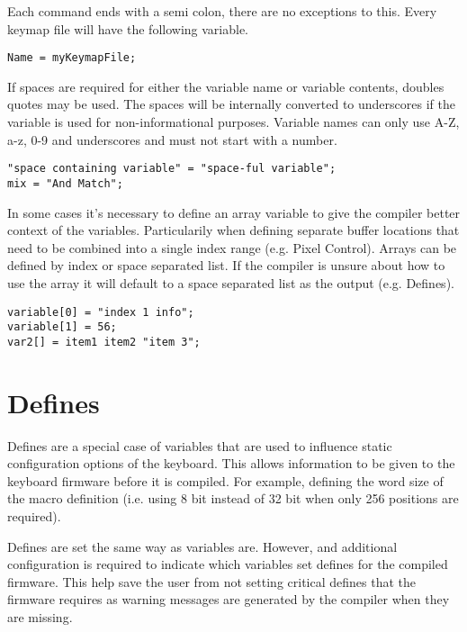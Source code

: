 \documentclass{kiibohd-template}
\begin{document}
Each command ends with a semi colon, there are no exceptions to this.
Every keymap file will have the following variable.

\begin{lstlisting}
Name = myKeymapFile;
\end{lstlisting}

If spaces are required for either the variable name or variable contents, doubles quotes may be used.
The spaces will be internally converted to underscores if the variable is used for non-informational purposes.
Variable names can only use A-Z, a-z, 0-9 and underscores and must not start with a number.

\begin{lstlisting}
"space containing variable" = "space-ful variable";
mix = "And Match";
\end{lstlisting}

In some cases it's necessary to define an array variable to give the compiler better context of the variables.
Particularily when defining separate buffer locations that need to be combined into a single index range (e.g. Pixel Control).
Arrays can be defined by index or space separated list.
If the compiler is unsure about how to use the array it will default to a space separated list as the output (e.g. Defines).

\begin{lstlisting}
variable[0] = "index 1 info";
variable[1] = 56;
var2[] = item1 item2 "item 3";
\end{lstlisting}


\section{Defines}
\label{sec:Defines}

Defines are a special case of variables that are used to influence static configuration options of the keyboard.
This allows information to be given to the keyboard firmware before it is compiled.
For example, defining the word size of the macro definition (i.e. using 8 bit instead of 32 bit when only 256 positions are required).

Defines are set the same way as variables are.
However, and additional configuration is required to indicate which variables set defines for the compiled firmware.
This help save the user from not setting critical defines that the firmware requires as warning messages are generated by the compiler when they are missing.
\end{document}
